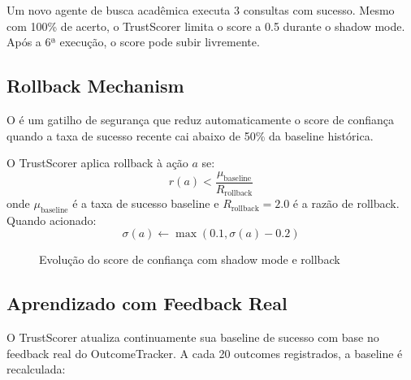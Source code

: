 \begin{exemplo}
Um novo agente de busca acadêmica executa 3 consultas com sucesso.
Mesmo com 100\% de acerto, o TrustScorer limita o score a 0.5 durante
o shadow mode. Após a 6ª execução, o score pode subir livremente.
\end{exemplo}

\subsection{Rollback Mechanism}

O  é um gatilho de segurança que reduz
automaticamente o score de confiança quando a taxa de sucesso recente
cai abaixo de 50\% da baseline histórica.

\begin{definicao}
O TrustScorer aplica rollback à ação $a$ se:
\[
r(a) < \frac{\mu_{\text{baseline}}}{R_{\text{rollback}}}
\]
onde $\mu_{\text{baseline}}$ é a taxa de sucesso baseline e
$R_{\text{rollback}} = 2.0$ é a razão de rollback. Quando acionado:
\[
\sigma(a) \gets \max(0.1, \sigma(a) - 0.2)
\]
\end{definicao}

\begin{figure}[htb]
\centering
\caption{Evolução do score de confiança com shadow mode e rollback}
\label{fig:trust-evolution}
\end{figure}

\subsection{Aprendizado com Feedback Real}

O TrustScorer atualiza continuamente sua baseline de sucesso com base
no feedback real do OutcomeTracker. A cada 20 outcomes registrados,
a baseline é recalculada:

